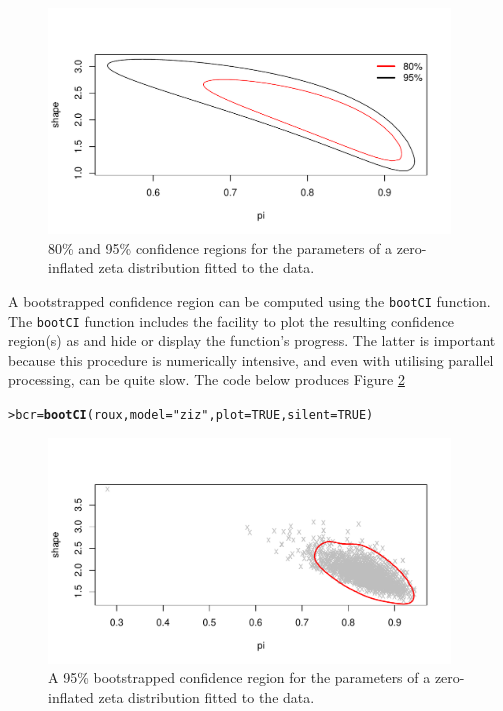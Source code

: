 \documentclass{article}\usepackage[]{graphicx}\usepackage[]{xcolor}
\makeatletter
\newcommand{\hlnum}[1]{\textcolor[rgb]{0.686,0.059,0.569}{#1}}%
\newcommand{\hlsng}[1]{\textcolor[rgb]{0.192,0.494,0.8}{#1}}%
\newcommand{\hldef}[1]{\textcolor[rgb]{0.345,0.345,0.345}{#1}}%
\newcommand{\hlkwb}[1]{\textcolor[rgb]{0.69,0.353,0.396}{#1}}%
\newcommand{\hlkwc}[1]{\textcolor[rgb]{0.333,0.667,0.333}{#1}}%
\newcommand{\hlkwd}[1]{\textcolor[rgb]{0.737,0.353,0.396}{\textbf{#1}}}%
\newenvironment{kframe}{%
 \def\at@end@of@kframe{}%
 \ifinner\ifhmode%
  \def\at@end@of@kframe{\end{minipage}}%
  \begin{minipage}{\columnwidth}%
 \fi\fi%
 \def\FrameCommand##1{\hskip\@totalleftmargin \hskip-\fboxsep
 \colorbox{shadecolor}{##1}\hskip-\fboxsep
     \hskip-\linewidth \hskip-\@totalleftmargin \hskip\columnwidth}%
 \MakeFramed {\advance\hsize-\width
   \@totalleftmargin\z@ \linewidth\hsize
   \@setminipage}}%
 {\par\unskip\endMakeFramed%
 \at@end@of@kframe}
\newenvironment{knitrout}{}{} %
\newcommand{\rcode}[1]{\lstinline[language=R,basicstyle=\normalsize\ttfamily]!#1!}
\makeatother
\begin{document}
\begin{figure}[ht]
\centering
  \includegraphics[width=0.95\textwidth,keepaspectratio]{confregion}
  \caption{80\% and 95\% confidence regions for the parameters of a zero-inflated zeta distribution fitted to the \citet{roux2001} data.}
  \label{fig:confregion}
\end{figure}
A bootstrapped confidence region can be computed using the \rcode{bootCI} function. The \rcode{bootCI} function includes the facility to plot the resulting confidence
region(s) as and hide or display the function's progress. The latter is important because this procedure is numerically intensive, and even with utilising parallel processing, can be quite slow. The code below produces Figure \ref{fig:bootconfregion}
\begin{knitrout}
\color{fgcolor}\begin{kframe}
\begin{alltt}
\hldef{> }\hldef{bcr} \hlkwb{=} \hlkwd{bootCI}\hldef{(roux,} \hlkwc{model} \hldef{=} \hlsng{"ziz"}\hldef{,} \hlkwc{plot} \hldef{=} \hlnum{TRUE}\hldef{,} \hlkwc{silent} \hldef{=} \hlnum{TRUE}\hldef{)}
\end{alltt}
\end{kframe}
\end{knitrout}\noindent
\begin{figure}[ht]
\centering
  \includegraphics[width=0.95\textwidth,keepaspectratio]{bootconfregion}
  \caption{A 95\% bootstrapped confidence region for the parameters of a zero-inflated zeta distribution fitted to the \citet{roux2001} data.}
  \label{fig:bootconfregion}
\end{figure}
\end{document}
